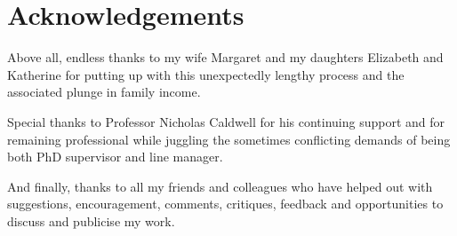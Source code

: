 \chapter*{Acknowledgements}
\label{chapter:acknowledgements}

Above all, endless thanks to my wife Margaret and my daughters Elizabeth and Katherine for putting up with this unexpectedly lengthy process and the associated plunge in family income.

Special thanks to Professor Nicholas Caldwell for his continuing support and for remaining professional while juggling the sometimes conflicting demands of being both PhD supervisor and line manager.

And finally, thanks to all my friends and colleagues who have helped out with suggestions, encouragement, comments, critiques, feedback and opportunities to discuss and publicise my work.
